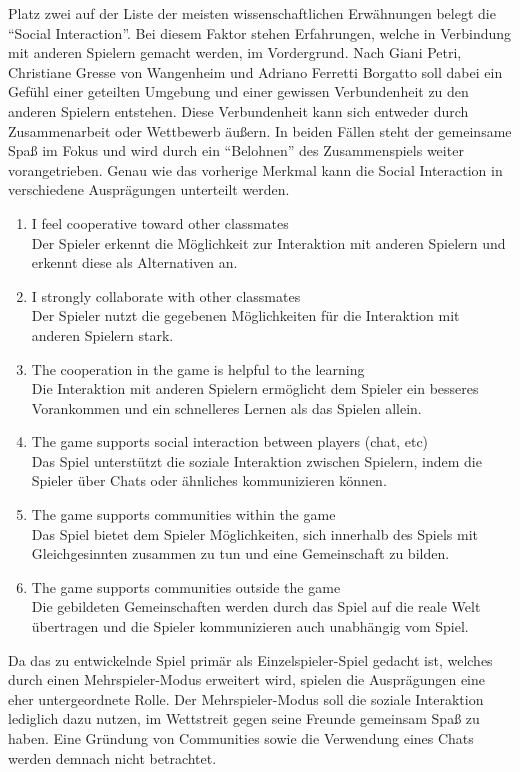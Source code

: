 	Platz zwei auf der Liste der meisten wissenschaftlichen Erwähnungen belegt die \enquote{Social Interaction}. Bei diesem Faktor stehen Erfahrungen, welche in Verbindung mit anderen Spielern gemacht werden, im Vordergrund. Nach Giani Petri, Christiane Gresse von Wangenheim und Adriano Ferretti Borgatto soll dabei ein Gefühl einer geteilten Umgebung und einer gewissen Verbundenheit zu den anderen Spielern entstehen. Diese Verbundenheit kann sich entweder durch Zusammenarbeit oder Wettbewerb äußern. In beiden Fällen steht der gemeinsame Spaß im Fokus und wird durch ein \enquote{Belohnen} des Zusammenspiels weiter vorangetrieben.
	Genau wie das vorherige Merkmal kann die Social Interaction in verschiedene Ausprägungen unterteilt werden.
	\begin{enumerate}
		\item{I feel cooperative toward other classmates}\hfill \\
		Der Spieler erkennt die Möglichkeit zur Interaktion mit anderen Spielern und erkennt diese als Alternativen an.
		\item{I strongly collaborate with other classmates}\hfill \\
		Der Spieler nutzt die gegebenen Möglichkeiten für die Interaktion mit anderen Spielern stark.
		\item{The cooperation in the game is helpful to the learning}\hfill \\
		Die Interaktion mit anderen Spielern ermöglicht dem Spieler ein besseres Vorankommen und ein schnelleres Lernen als das Spielen allein.
		\item{The game supports social interaction between players (chat, etc)}\hfill \\
		Das Spiel unterstützt die soziale Interaktion zwischen Spielern, indem die Spieler über Chats oder ähnliches kommunizieren können.
		\item{The game supports communities within the game}\hfill \\
		Das Spiel bietet dem Spieler Möglichkeiten, sich innerhalb des Spiels mit Gleichgesinnten zusammen zu tun und eine Gemeinschaft zu bilden.
		\item{The game supports communities outside the game}\hfill \\
		Die gebildeten Gemeinschaften werden durch das Spiel auf die reale Welt übertragen und die Spieler kommunizieren auch unabhängig vom Spiel.
	\end{enumerate}
	Da das zu entwickelnde Spiel primär als Einzelspieler-Spiel gedacht ist, welches durch einen Mehrspieler-Modus erweitert wird, spielen die Ausprägungen eine eher untergeordnete Rolle. Der Mehrspieler-Modus soll die soziale Interaktion lediglich dazu nutzen, im Wettstreit gegen seine Freunde gemeinsam Spaß zu haben. Eine Gründung von Communities sowie die Verwendung eines Chats werden demnach nicht betrachtet.

